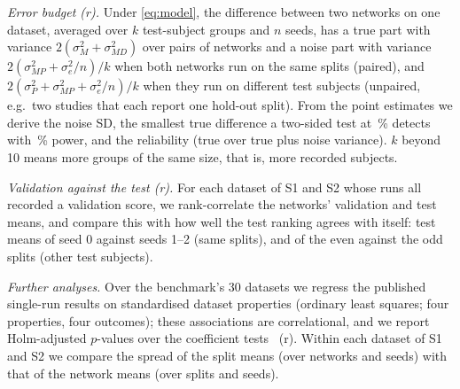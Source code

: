 \documentclass{IEEE_lsens}
\begin{document}
\emph{Error budget (r).} Under \eqref{eq:model}, the difference between two networks on one dataset, averaged over $k$ test-subject
groups and $n$ seeds, has a true part with variance $2(\sigma^2_M+\sigma^2_{MD})$ over pairs of networks and a noise
part with variance $2(\sigma^2_{MP}+\sigma^2_e/n)/k$ when both networks run on the same splits (paired), and
$2(\sigma^2_P+\sigma^2_{MP}+\sigma^2_e/n)/k$ when they run on different test subjects (unpaired, e.g.\ two studies
that each report one hold-out split). From the point estimates we derive the noise SD, the smallest true difference a
two-sided test at \,\% detects with \,\% power, and the reliability (true over
true plus noise variance). $k$ beyond 10 means more groups of the same size, that is, more recorded subjects.

\emph{Validation against the test (r).} For each dataset of S1 and S2 whose runs all recorded a validation score, we
rank-correlate the networks' validation and test means, and compare this with how well the test ranking agrees with
itself: test means of seed 0 against seeds 1--2 (same splits), and of the even against the odd splits (other test
subjects).

\emph{Further analyses.} Over the
benchmark's 30 datasets we regress the published single-run results on standardised dataset properties (ordinary least
squares; four properties, four outcomes); these associations are correlational, and we report Holm-adjusted
$p$-values over the  coefficient tests~\cite{holm1979simple} (r). Within each dataset of S1 and S2 we
compare the spread of the split means (over networks and seeds) with that of the network means (over splits and
seeds).
\end{document}
